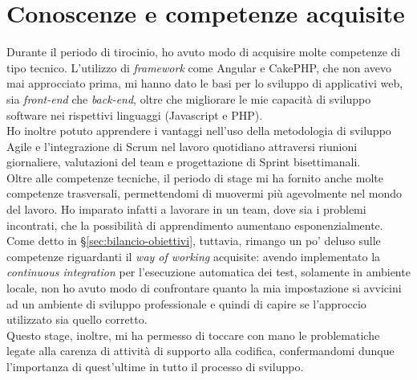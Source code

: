 \section{Conoscenze e competenze acquisite}
Durante il periodo di tirocinio, ho avuto modo di acquisire molte competenze di tipo tecnico. L'utilizzo di \textit{\gls{framework}} come Angular e CakePHP, che non avevo mai approcciato prima, mi hanno dato le basi per lo sviluppo di applicativi web, sia \textit{\gls{front-end}} che \textit{\gls{back-end}}, oltre che migliorare le mie capacità di sviluppo software nei rispettivi linguaggi (Javascript e PHP).\\
Ho inoltre potuto apprendere i vantaggi nell'uso della metodologia di sviluppo Agile e l'integrazione di Scrum nel lavoro quotidiano attraversi riunioni giornaliere, valutazioni del team e progettazione di Sprint bisettimanali.\\
Oltre alle competenze tecniche, il periodo di stage mi ha fornito anche molte competenze trasversali, permettendomi di muovermi più agevolmente nel mondo del lavoro. Ho imparato infatti a lavorare in un team, dove sia i problemi incontrati, che la possibilità di apprendimento aumentano esponenzialmente. \\
Come detto in §\ref{sec:bilancio-obiettivi}, tuttavia, rimango un po' deluso sulle competenze riguardanti il \textit{\gls{way of working}} acquisite: avendo implementato la \textit{\gls{continuous integration}} per l'esecuzione automatica dei test, solamente in ambiente locale, non ho avuto modo di confrontare quanto la mia impostazione si avvicini ad un ambiente di sviluppo professionale e quindi di capire se l'approccio utilizzato sia quello corretto. \\
Questo stage, inoltre, mi ha permesso di toccare con mano le problematiche legate alla carenza di attività di supporto alla codifica, confermandomi dunque l'importanza di quest'ultime in tutto il processo di sviluppo.

